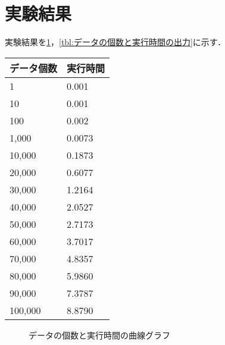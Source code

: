 \section{実験結果}
実験結果を\ref{fig:データの個数と実行時間の曲線グラフ}，\ref{tbl:データの個数と実行時間の出力}に示す．\\
\begin{minipage}{0.3\textwidth}
    \begin{center}
        \begin{tabular}{ll}
            \multicolumn{1}{c}{データ個数} & \multicolumn{1}{c}{実行時間} \\
            \hline
            1                         & 0.001                    \\
            10                        & 0.001                    \\
            100                       & 0.002                    \\
            1,000                     & 0.0073                   \\
            10,000                    & 0.1873                   \\
            20,000                    & 0.6077                   \\
            30,000                    & 1.2164                   \\
            40,000                    & 2.0527                   \\
            50,000                    & 2.7173                   \\
            60,000                    & 3.7017                   \\
            70,000                    & 4.8357                   \\
            80,000                    & 5.9860                   \\
            90,000                    & 7.3787                   \\
            100,000                   & 8.8790                   \\
            \hline
        \end{tabular}
    \end{center}
\end{minipage}
\begin{figure}[h]
    \centering
    \caption{データの個数と実行時間の曲線グラフ}
    \label{fig:データの個数と実行時間の曲線グラフ}
\end{figure}

